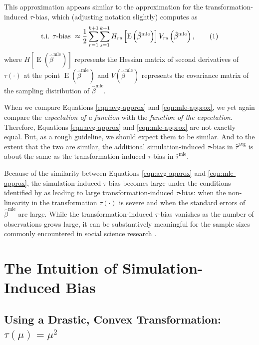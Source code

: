 \documentclass[11pt]{article}
\newcommand\numberthis{\addtocounter{equation}{1}\tag{\theequation}}
\DeclareMathOperator*{\E}{\text{E}}
\begin{document}
This approximation appears similar to the approximation for the transformation-induced $\tau$-bias, which (adjusting notation slightly) \citet[p. 405, Eq. 1]{Rainey2017} computes as
\begin{align*}
\text{t.i. } \tau \text{-bias } \approx \dfrac{1}{2} \displaystyle \sum_{r = 1}^{k+1} \sum_{s = 1}^{k+1} H_{rs}\left[ \E \left( \hat{\beta}^\text{mle} \right) \right] V_{rs} \left( \hat{\beta}^{\text{mle}} \right), \numberthis \label{eqn:mle-approx}
\end{align*}
where $H\left[ \E \left( \hat{\beta}^\text{mle} \right) \right]$ represents the Hessian matrix of second derivatives of $\tau(\cdot)$ at the point $\E \left( \hat{\beta}^\text{mle} \right)$ and $V \left( \hat{\beta}^{\text{mle}} \right)$ represents the covariance matrix of the sampling distribution of $\hat{\beta}^\text{mle}$.

When we compare Equations \ref{eqn:avg-approx} and \ref{eqn:mle-approx}, we yet again compare the \textit{expectation of a function} with the \textit{function of the expectation}.
Therefore, Equations \ref{eqn:avg-approx} and \ref{eqn:mle-approx} are not exactly equal.
But, as a rough guideline, we should expect them to be similar.
And to the extent that the two are similar, the additional simulation-induced $\tau$-bias in $\hat{\tau}^\text{avg}$ is about the same as the transformation-induced $\tau$-bias in $\hat{\tau}^\text{mle}$. 

Because of the similarity between Equations \ref{eqn:avg-approx} and \ref{eqn:mle-approx}, the simulation-induced $\tau$-bias becomes large under the conditions identified by \cite{Rainey2017} as leading to large transformation-induced $\tau$-bias: when the non-linearity in the transformation $\tau(\cdot)$ is severe and when the standard errors of $\hat{\beta}^\text{mle}$ are large.
While the transformation-induced $\tau$-bias vanishes as the number of observations grows large, it can be substantively meaningful for the sample sizes commonly encountered in social science research \citep{Rainey2017}.

\section*{The Intuition of Simulation-Induced Bias}

\subsection*{Using a Drastic, Convex Transformation: $\tau(\mu) = \mu^2$}
\end{document}
